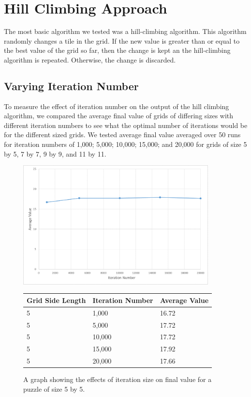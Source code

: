 \documentclass[12pt]{article}
\begin{document}
\section*{Hill Climbing Approach}

The most basic algorithm we tested was a hill-climbing algorithm. This algorithm randomly changes a tile in the grid. If the new value is greater than or equal to the best value of the grid so far, then the change is kept an the hill-climbing algorithm is repeated. Otherwise, the change is discarded. 

\subsection*{Varying Iteration Number}

To measure the effect of iteration number on the output of the hill climbing algorithm, we compared the average final value of grids of differing sizes with different iteration numbers to see what the optimal number of iterations would be for the different sized grids. We tested average final value averaged over 50 runs for iteration numbers of 1,000; 5,000; 10,000; 15,000; and 20,000 for grids of size 5 by 5, 7 by 7, 9 by 9, and 11 by 11.

\begin{figure}[H]
    \centering
    \includegraphics[width=0.9\textwidth]{hill_climbing_5x5_iterations_excel}
\begin{tabular}{ |p{4cm}||p{4cm}|p{4cm}|  }
 \hline
Grid Side Length& Iteration Number &Average Value\\
 \hline
5&1,000&16.72\\
5&5,000&17.72\\
5&10,000&17.72\\
5&15,000&17.92\\
5&20,000&17.66\\
 \hline
\end{tabular}
    \caption{A graph showing the effects of iteration size on final value for a puzzle of size 5 by 5.}
    \label{fig:hill_climbing_5x5_iterations}
\end{figure}
\end{document}
